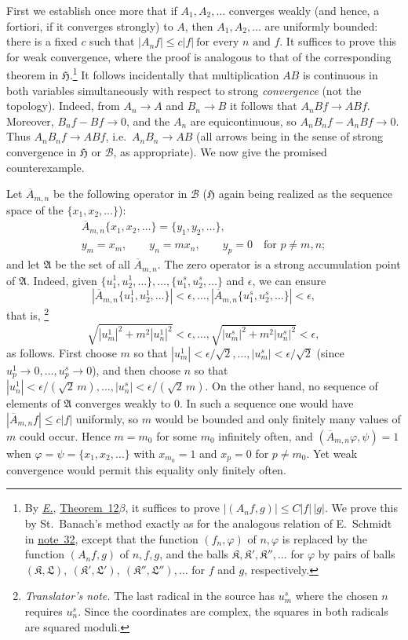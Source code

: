 \documentclass[
  paper=b5,
  twoside=true,
  fontsize=13pt,
  headings=normal,
  bookmarkpackage=false
]{scrartcl}
\theoremstyle{definition}
\newcommand{\NoteRef}[1]{\hyperref[fn:#1]{note~#1}}
\newcommand{\Eref}{\hyperref[fn:E-paper]{\emph{E.}}}
\newcommand{\ErefText}[1]{\href{https://doi.org/10.1007/BF01782338}{#1}}
\newcounter{translatornote}
\newcounter{savedfootnote}
\newcommand{\TranslatorNote}[1]{%
  \stepcounter{translatornote}%
  \setcounter{savedfootnote}{\value{footnote}}%
  \begingroup
    \renewcommand{\thefootnote}{T\arabic{translatornote}}%
    \footnote{\textit{Translator's note.} #1}%
  \endgroup
  \setcounter{footnote}{\value{savedfootnote}}}
\begin{document}
First we establish once more that if $A_1,A_2,\ldots$ converges weakly
(and hence, a fortiori, if it converges strongly) to $A$, then $A_1,A_2,\ldots$ are uniformly bounded: there is a fixed $c$ such that $|A_nf|\leq c|f| \ \text{for every $n$ and $f$}$.
It suffices to prove this for weak convergence, where the proof is
analogous to that of the corresponding theorem in $\mathfrak H$.\footnote{\label{fn:35}By \Eref, \ErefText{Theorem~12$\beta$}, it suffices to prove $|(A_nf,g)|\leq C|f|\,|g|$.
We prove this by St.~Banach's method exactly as for the analogous relation
of E.~Schmidt in \NoteRef{32}, except that the function $(f_n,\varphi)$ of $n,\varphi$ is replaced by the function $(A_nf,g)$ of $n,f,g$, and the
balls $\mathfrak{K},\mathfrak{K}',\mathfrak{K}'',\ldots$ for $\varphi$ by
pairs of balls $(\mathfrak{K},\mathfrak{L}),\ (\mathfrak{K}',\mathfrak{L}'),\ (\mathfrak{K}'',\mathfrak{L}''),\ldots$
for $f$ and $g$, respectively.}
It follows incidentally that multiplication $AB$ is continuous in both
variables simultaneously with respect to strong \emph{convergence} (not the
topology). Indeed, from $A_n\to A$ and $B_n\to B$ it follows that $A_nBf\longrightarrow ABf$.
Moreover, $B_nf-Bf\to0$, and the $A_n$ are equicontinuous, so $A_nB_nf-A_nBf\longrightarrow0$.
Thus $A_nB_nf\to ABf$, i.e.\ $A_nB_n\to AB$ (all arrows being in the sense
of strong convergence in $\mathfrak H$ or $\mathcal B$, as appropriate).
We now give the promised counterexample.

Let $\overline A_{m,n}$ be the following operator in $\mathcal B$
($\mathfrak H$ again being realized as the sequence space of the $\{x_1,x_2,\ldots\}$):
\begin{gather*}
  \overline A_{m,n}\{x_1,x_2,\ldots\}=\{y_1,y_2,\ldots\},\\
  y_m=x_m,\qquad y_n=mx_n,\qquad y_p=0\quad\text{for }p\neq m,n;
\end{gather*}
and let $\mathfrak A$ be the set of all $\overline A_{m,n}$.
The zero operator is a strong accumulation point of $\mathfrak A$.
Indeed, given $\{u_1^1,u_2^1,\ldots\},\ldots,\{u_1^s,u_2^s,\ldots\}$ and
$\epsilon$, we can ensure
\[
 |\overline A_{m,n}\{u_1^1,u_2^1,\ldots\}|<\epsilon,\ldots,
 |\overline A_{m,n}\{u_1^s,u_2^s,\ldots\}|<\epsilon,
\]
that is,\TranslatorNote{The last radical in the source has \(u_m^s\)
where the chosen \(n\) requires \(u_n^s\). Since the coordinates are
complex, the squares in both radicals are squared moduli.}
\[
 \sqrt{|u_m^1|^2+m^2|u_n^1|^2}<\epsilon,\ldots,
 \sqrt{|u_m^s|^2+m^2|u_n^s|^2}<\epsilon,
\]
as follows. First choose $m$ so that
$|u_m^1|<\epsilon/\sqrt{2},\ldots,|u_m^s|<\epsilon/\sqrt{2}$ (since
$u_p^1\to0,\ldots,u_p^s\to0$), and then choose $n$ so that
$|u_n^1|<\epsilon/(\sqrt{2}\,m),\ldots,|u_n^s|<\epsilon/(\sqrt{2}\,m)$.
On the other hand, no sequence of elements of $\mathfrak A$ converges
weakly to $0$. In such a sequence one would have
$|\overline A_{m,n}f|\leq c|f|$ uniformly, so $m$ would be bounded and only
finitely many values of $m$ could occur. Hence $m=m_0$ for some $m_0$
infinitely often, and $(\overline A_{m,n}\varphi,\psi)=1$ when
$\varphi=\psi=\{x_1,x_2,\ldots\}$ with $x_{m_0}=1$ and $x_p=0$ for
$p\ne m_0$. Yet weak convergence would permit this equality only finitely
often.
\end{document}
